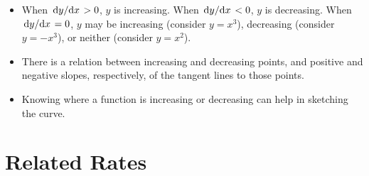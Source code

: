 \documentclass[../main.tex]{subfiles}
\begin{document}
\begin{itemize}
\begin{itemize}
    \end{itemize}
    \item When $\dv*{y}{x}>0$, $y$ is increasing. When $\dv*{y}{x}<0$, $y$ is decreasing. When $\dv*{y}{x}=0$, $y$ may be increasing (consider $y=x^3$), decreasing (consider $y=-x^3$), or neither (consider $y=x^2$).
    \item There is a relation between increasing and decreasing points, and positive and negative slopes, respectively, of the tangent lines to those points.
    \item Knowing where a function is increasing or decreasing can help in sketching the curve.
\end{itemize}



\section{Related Rates}
\end{document}
